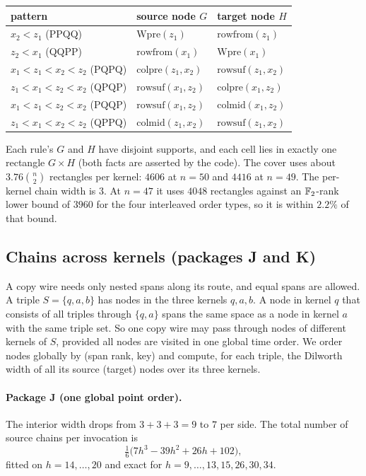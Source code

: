 \begin{center}
\small
\begin{tabular}{@{}lll@{}}
\toprule
pattern & source node $G$ & target node $H$ \\
\midrule
$x_2<z_1$ (PPQQ) & $\mathrm{Wpre}(z_1)$ & $\mathrm{rowfrom}(z_1)$ \\
$z_2<x_1$ (QQPP) & $\mathrm{rowfrom}(x_1)$ & $\mathrm{Wpre}(x_1)$ \\
$x_1<z_1<x_2<z_2$ (PQPQ) & $\mathrm{colpre}(z_1,x_2)$ & $\mathrm{rowsuf}(z_1,x_2)$ \\
$z_1<x_1<z_2<x_2$ (QPQP) & $\mathrm{rowsuf}(x_1,z_2)$ & $\mathrm{colpre}(x_1,z_2)$ \\
$x_1<z_1<z_2<x_2$ (PQQP) & $\mathrm{rowsuf}(x_1,z_2)$ & $\mathrm{colmid}(x_1,z_2)$ \\
$z_1<x_1<x_2<z_2$ (QPPQ) & $\mathrm{colmid}(z_1,x_2)$ & $\mathrm{rowsuf}(z_1,x_2)$ \\
\bottomrule
\end{tabular}
\end{center}

Each rule's $G$ and $H$ have disjoint supports, and each cell lies in exactly one rectangle $G\times H$ (both facts are asserted by the code). The cover uses about $3.76\binom n2$ rectangles per kernel: $4606$ at $n = 50$ and $4416$ at $n = 49$. The per-kernel chain width is $3$. At $n = 47$ it uses $4048$ rectangles against an $\mathbb{F}_2$-rank lower bound of $3960$ for the four interleaved order types, so it is within $2.2\%$ of that bound.

\subsection{Chains across kernels (packages J and K)}

A copy wire needs only nested spans along its route, and equal spans are allowed. A triple $S = \{q,a,b\}$ has nodes in the three kernels $q,a,b$. A node in kernel $q$ that consists of all triples through $\{q,a\}$ spans the same space as a node in kernel $a$ with the same triple set. So one copy wire may pass through nodes of different kernels of $S$, provided all nodes are visited in one global time order. We order nodes globally by (span rank, key) and compute, for each triple, the Dilworth width of all its source (target) nodes over its three kernels.

\paragraph{Package J (one global point order).} The interior width drops from $3+3+3 = 9$ to $7$ per side. The total number of source chains per invocation is
\[
\tfrac16\bigl(7h^3 - 39h^2 + 26h + 102\bigr),
\]
fitted on $h = 14,\dots,20$ and exact for $h = 9,\dots,13, 15, 26, 30, 34$.

